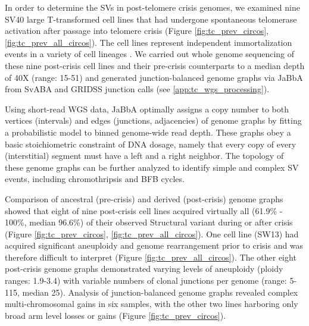 \documentclass[phd,tocprelim]{cornell}
\begin{document}
In order to determine the SVs in post-telomere crisis genomes, we examined nine SV40 large T-transformed cell lines that had undergone spontaneous telomerase activation after passage into telomere crisis (Figure \ref{fig:tc_prev_circos}, \ref{fig:tc_prev_all_circos}). The cell lines represent independent immortalization events in a variety of cell lineages \cite{Bryan1995-ik,Shay1989-ua,Counter1992-yg}. We carried out whole genome sequencing of these nine post-crisis cell lines and their pre-crisis counterparts to a median depth of 40X (range: 15-51) and generated junction-balanced genome graphs\cite{Hadi2020-um} via JaBbA from SvABA\cite{Wala2018-qa} and GRIDSS\cite{Cameron2021-db} junction calls (see \ref{app:tc_wgs_processing}).

Using short-read WGS data, JaBbA optimally assigns a copy number to both vertices (intervals) and edges (junctions, adjacencies) of genome graphs by fitting a probabilistic model to binned genome-wide read depth. These graphs obey a basic stoichiometric constraint of DNA dosage, namely that every copy of every (interstitial) segment must have a left and a right neighbor. The topology of these genome graphs can be further analyzed to identify simple and complex SV events, including chromothripsis and BFB cycles.

Comparison of ancestral (pre-crisis) and derived (post-crisis) genome graphs showed that eight of nine post-crisis cell lines acquired virtually all (61.9\% - 100\%, median 96.6\%) of their observed Structural variant during or after crisis (Figure \ref{fig:tc_prev_circos}, \ref{fig:tc_prev_all_circos}). One cell line (SW13) had acquired significant aneuploidy and genome rearrangement prior to crisis and was therefore difficult to interpret (Figure \ref{fig:tc_prev_all_circos}). The other eight post-crisis genome graphs demonstrated varying levels of aneuploidy (ploidy ranges: 1.9-3.4) with variable numbers of clonal junctions per genome (range: 5-115, median 25). Analysis of junction-balanced genome graphs \cite{Hadi2020-um} revealed complex multi-chromosomal gains in six samples, with the other two lines harboring only broad arm level losses or gains (Figure \ref{fig:tc_prev_circos}).
\end{document}
